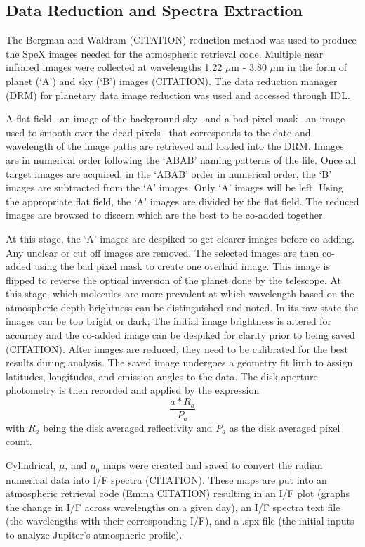 \documentclass[a4paper,fleqn]{cas-dc}
\begin{document}
\subsection{Data Reduction and Spectra Extraction}
The Bergman and Waldram (CITATION) reduction method was used to produce the SpeX images needed for the atmospheric retrieval code. Multiple near infrared images were collected at wavelengths 1.22 $\mu$m - 3.80 $\mu$m in the form of planet (‘A’) and sky (‘B’) images (CITATION). The data reduction manager (DRM) for planetary data image reduction was used and accessed through IDL.

A flat field –an image of the background sky– and a bad pixel mask –an image used to smooth over the dead pixels– that corresponds to the date and wavelength of the image paths are retrieved and loaded into the DRM. Images are in numerical order following the ‘ABAB’ naming patterns of the file. Once all target images are acquired, in the ‘ABAB’ order in numerical order, the ‘B’ images are subtracted from the ‘A’ images. Only ‘A’ images will be left. Using the appropriate flat field, the ‘A’ images are divided by the flat field. The reduced images are browsed to discern which are the best to be co-added together. 

At this stage, the ‘A’ images are despiked to get clearer images before co-adding. Any unclear or cut off images are removed. The selected images are then co-added using the bad pixel mask to create one overlaid image. This image is flipped to reverse the optical inversion of the planet done by the telescope. At this stage, which molecules are more prevalent at which wavelength based on the atmospheric depth brightness can be distinguished and noted. In its raw state the images can be too bright or dark; The initial image brightness is altered for accuracy and the co-added image can be despiked for clarity prior to being saved (CITATION). After images are reduced, they need to be calibrated for the best results during analysis. The saved image undergoes a geometry fit limb to assign latitudes, longitudes, and emission angles to the data. The disk aperture photometry is then recorded and applied by the expression
\begin{equation}
\frac{a*R_a}{P_a} 
\end{equation}
with $R_a$ being the disk averaged reflectivity and $P_a$ as the disk averaged pixel count. 

Cylindrical, $\mu$, and $\mu_0$ maps were created and saved to convert the radian numerical data into I/F spectra (CITATION). These maps are put into an atmospheric retrieval code (Emma CITATION) resulting in an I/F plot (graphs the change in I/F across wavelengths on a given day), an I/F spectra text file (the wavelengths with their corresponding I/F), and a .spx file (the initial inputs to analyze Jupiter’s atmospheric profile). 
\end{document}
